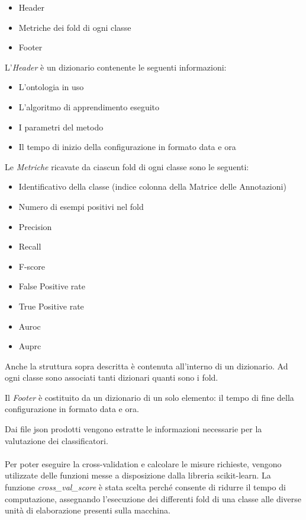 \documentclass[12pt,a4paper,oneside,hidelinks]{report}
\begin{document}
\begin{itemize}
    \item Header
    \item Metriche dei fold di ogni classe
    \item Footer
\end{itemize}
L'\textit{Header} è un dizionario contenente le seguenti informazioni:
\begin{itemize}
    \item L'ontologia in uso
    \item L'algoritmo di apprendimento eseguito
    \item I parametri del metodo
    \item Il tempo di inizio della configurazione in formato data e ora
\end{itemize}
Le \textit{Metriche} ricavate da ciascun fold di ogni classe sono le seguenti:
\begin{itemize}
    \item Identificativo della classe (indice colonna della Matrice delle Annotazioni)
    \item Numero di esempi positivi nel fold
    \item Precision
    \item Recall
    \item F-score
    \item False Positive rate
    \item True Positive rate
    \item Auroc
    \item Auprc
\end{itemize}
Anche la struttura sopra descritta è contenuta all'interno di un dizionario. Ad ogni classe sono associati tanti dizionari quanti sono i fold.

Il \textit{Footer} è costituito da un dizionario di un solo elemento: il tempo di fine della configurazione in formato data e ora.

Dai file json prodotti vengono estratte le informazioni necessarie per la valutazione dei classificatori.

\paragraph*{}
Per poter eseguire la cross-validation e calcolare le misure richieste, vengono utilizzate delle funzioni messe a disposizione dalla libreria scikit-learn.
La funzione \textit{cross\_val\_score} è stata scelta perché consente di ridurre il tempo di computazione, assegnando l'esecuzione dei differenti fold di una classe alle diverse unità di elaborazione presenti sulla macchina.
\end{document}
